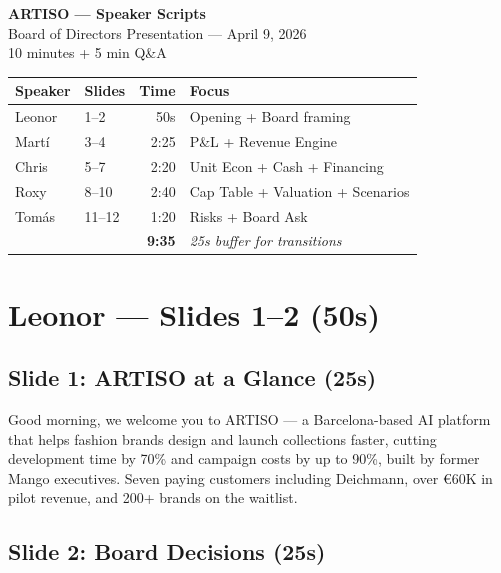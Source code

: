 \documentclass[11pt,a4paper]{article}
\begin{document}
\begin{center}
{\LARGE\bfseries\color{artiso} ARTISO — Speaker Scripts}\\[6pt]
{\large Board of Directors Presentation — April 9, 2026}\\[4pt]
{\normalsize 10 minutes + 5 min Q\&A}\\[12pt]
\begin{tabular}{llrl}
\toprule
\textbf{Speaker} & \textbf{Slides} & \textbf{Time} & \textbf{Focus} \\
\midrule
Leonor & 1--2 & 50s & Opening + Board framing \\
Mart\'{i} & 3--4 & 2:25 & P\&L + Revenue Engine \\
Chris & 5--7 & 2:20 & Unit Econ + Cash + Financing \\
Roxy & 8--10 & 2:40 & Cap Table + Valuation + Scenarios \\
Tom\'{a}s & 11--12 & 1:20 & Risks + Board Ask \\
\midrule
& & \textbf{9:35} & \textit{25s buffer for transitions} \\
\bottomrule
\end{tabular}
\end{center}

\vspace{8pt}

\section{Leonor --- Slides 1--2 (50s)}

\subsection{Slide 1: ARTISO at a Glance (\texttildelow25s)}

Good morning, we welcome you to ARTISO --- a Barcelona-based AI platform that helps fashion brands design and launch collections faster, cutting development time by 70\% and campaign costs by up to 90\%, built by former Mango executives. Seven paying customers including Deichmann, over \euro{}60K in pilot revenue, and 200+ brands on the waitlist.

\subsection{Slide 2: Board Decisions (\texttildelow25s)}
\end{document}
